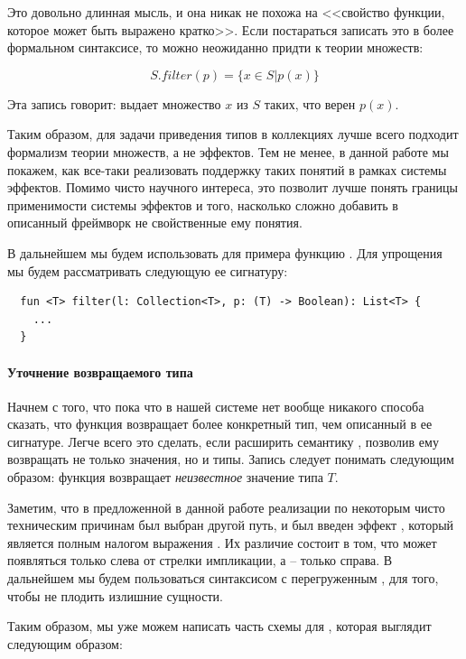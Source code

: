 Это довольно длинная мысль, и она никак не похожа на <<свойство функции, которое может быть выражено кратко>>. Если постараться записать это в более формальном синтаксисе, то можно неожиданно придти к теории множеств:

$$ S.filter(p) = \{ x \in S | p(x) \} $$

Эта запись говорит:  выдает множество $x$ из $S$ таких, что верен $p(x)$.

Таким образом, для задачи приведения типов в коллекциях лучше всего подходит формализм теории множеств, а не эффектов. Тем не менее, в данной работе мы покажем, как все-таки реализовать поддержку таких понятий в рамках системы эффектов. Помимо чисто научного интереса, это позволит лучше понять границы применимости системы эффектов и того, насколько сложно добавить в описанный фреймворк не свойственные ему понятия.

В дальнейшем мы будем использовать для примера функцию . Для упрощения мы будем рассматривать следующую ее сигнатуру:

\begin{verbatim}
  fun <T> filter(l: Collection<T>, p: (T) -> Boolean): List<T> {
    ...
  }
\end{verbatim}

\paragraph{Уточнение возвращаемого типа}

Начнем с того, что пока что в нашей системе нет вообще никакого способа сказать, что функция возвращает более конкретный тип, чем описанный в ее сигнатуре. Легче всего это сделать, если расширить семантику , позволив ему возвращать не только значения, но и типы. Запись  следует понимать следующим образом: функция возвращает \emph{неизвестное} значение типа $T$.

Заметим, что в предложенной в данной работе реализации по некоторым чисто техническим причинам был выбран другой путь, и был введен эффект , который является полным налогом выражения . Их различие состоит в том, что  может появляться только слева от стрелки импликации, а  -- только справа. В дальнейшем мы будем пользоваться синтаксисом с перегруженным , для того, чтобы не плодить излишние сущности.

Таким образом, мы уже можем написать часть схемы для , которая выглядит следующим образом:

